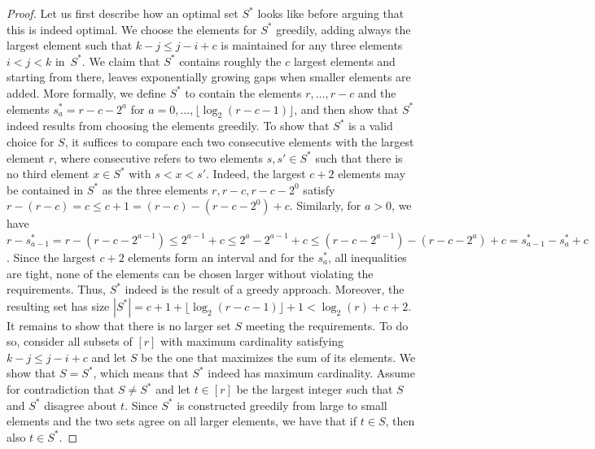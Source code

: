 \documentclass[11pt]{article}
\begin{document}
\begin{proof}%
    Let us first describe how an optimal set $ S^* $ looks like before arguing that this is indeed optimal.
    We choose the elements for $ S^* $ greedily, adding always the largest element such that $ k - j \leq j - i + c $ is maintained for any three elements $ i < j < k $ in~$ S^* $.
    We claim that $ S^* $ contains roughly the $ c $ largest elements and starting from there, leaves exponentially growing gaps when smaller elements are added.
    More formally, we define $ S^* $ to contain the elements $ r, \dots, r - c $ and the elements $ s_a^* = r - c - 2^a $ for $ a = 0, \dots, \lfloor \log_2(r - c - 1) \rfloor $, and then show that $ S^* $ indeed results from choosing the elements greedily.
    To show that $ S^* $ is a valid choice for $ S $, it suffices to compare each two consecutive elements with the largest element $ r $, where consecutive refers to two elements $ s, s' \in S^* $ such that there is no third element $ x \in S^* $ with $ s < x < s' $.
    Indeed, the largest $ c + 2 $ elements may be contained in $ S^* $ as the three elements $ r, r-c, r - c - 2^0 $ satisfy $ r - (r - c) = c \leq c+1 = (r-c) - (r-c - 2^0) + c $.
    Similarly, for $ a > 0 $, we have 
    $ r - s_{a-1}^* 
    = r - (r - c - 2^{a-1}) 
    \leq 2^{a-1} + c
    \leq 2^{a} - 2^{a-1} + c
    \leq (r - c - 2^{a-1}) - (r - c - 2^{a}) + c
    = s_{a-1}^* - s_{a}^* + c$.
    Since the largest $ c + 2 $ elements form an interval and for the $ s_a^* $, all inequalities are tight, none of the elements can be chosen larger without violating the requirements.
    Thus, $ S^* $ indeed is the result of a greedy approach.
    Moreover, the resulting set has size $ |S^*| = c + 1 + \lfloor \log_2(r - c - 1) \rfloor + 1 < \log_2(r) + c + 2 $.
%
    It remains to show that there is no larger set $ S $ meeting the requirements. 
    To do so, consider all subsets of $ [r] $ with maximum cardinality satisfying $ k - j \leq j - i + c $ and let $ S $ be the one that maximizes the sum of its elements.
    We show that $ S = S^* $, which means that $ S^* $ indeed has maximum cardinality.
    Assume for contradiction that $S \neq S^*$ and let $ t \in [r] $ be the largest integer such that $ S $ and $ S^* $ disagree about $ t $. 
    Since $ S^* $ is constructed greedily from large to small elements and the two sets agree on all larger elements, we have that if $ t \in S $, then also $ t \in S^* $.

\end{proof}
\end{document}
